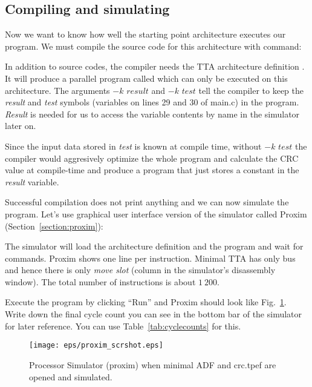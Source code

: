 \documentclass[twoside]{tceusermanual}
\begin{document}
\subsection{Compiling and simulating}
\label{ssec:eval_start}
Now we want to know how well the starting point architecture executes
our program. We must compile the source code for this architecture
with command:


In addition to source codes, the compiler needs the TTA architecture
definition . It will produce a parallel program called
 which can only be executed on this architecture. The arguments
$-k$ $result$ and $-k$ $test$ tell the compiler to keep the \textit{result} and
\textit{test} symbols (variables on lines 29 and 30 of main.c) in the program.
\textit{Result} is needed for us to access the variable contents by name in the
simulator later on.

Since the input data stored in \textit{test} is known at compile time, without $-k$ $test$ the compiler would aggresively optimize the whole program and
calculate the CRC value at compile-time and produce a program that just stores
a constant in the \textit{result} variable.

Successful compilation does not print anything and we can now simulate
the program. Let's use graphical user interface version of the
simulator called Proxim (Section~\ref{section:proxim}):


The simulator will load the architecture definition and the program
and wait for commands. Proxim shows one line per instruction. Minimal
TTA has only bus and hence there is only \textit{move slot}
(column in the simulator's disassembly window). The total number of instructions is about $1~200$.

Execute the program by clicking ``Run'' and Proxim should look like
Fig.~\ref{fig:proxim}.  Write down the final cycle count you can see in the bottom bar of the simulator for later reference.
You can use Table~\ref{tab:cyclecounts} for this.

\begin{figure}
  \begin{center}
    \texttt{[image: eps/proxim\_scrshot.eps]}
    \caption{Processor Simulator (proxim) when minimal ADF 
             and crc.tpef are opened and simulated.}
    \label{fig:proxim}
  \end{center}
\end{figure}
\end{document}
